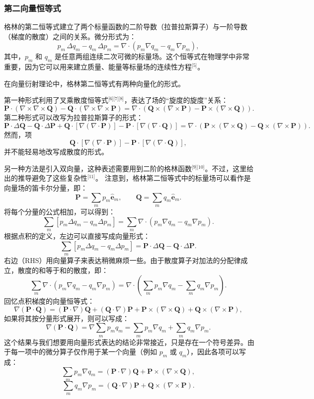 \subsubsection{第二向量恒等式}
格林的第二恒等式建立了两个标量函数的二阶导数（拉普拉斯算子）与一阶导数（梯度的散度）之间的关系。微分形式为：
$$
p_{m}\,\Delta q_{m} - q_{m}\,\Delta p_{m} = \nabla \cdot \left(p_{m}\nabla q_{m} - q_{m}\,\nabla p_{m}\right),~
$$
其中，$p_{m}$ 和 $q_{m}$ 是任意两组连续二次可微的标量场。这个恒等式在物理学中非常重要，因为它可以用来建立质量、能量等标量场的连续性方程\(^\text{[5]}\)。

在向量衍射理论中，格林第二恒等式有两种向量化的形式。

第一种形式利用了叉乘散度恒等式\(^\text{[6][7][8]}\)，表达了场的“旋度的旋度”关系：
$$
\mathbf{P} \cdot (\nabla \times \nabla \times \mathbf{Q})
- \mathbf{Q} \cdot (\nabla \times \nabla \times \mathbf{P})
= \nabla \cdot \left(\mathbf{Q} \times (\nabla \times \mathbf{P})
- \mathbf{P} \times (\nabla \times \mathbf{Q})\right).~
$$
第二种形式可以改写为拉普拉斯算子的形式：
$$
\mathbf{P} \cdot \Delta \mathbf{Q} 
- \mathbf{Q} \cdot \Delta \mathbf{P} 
+ \mathbf{Q} \cdot [\nabla (\nabla \cdot \mathbf{P})]
- \mathbf{P} \cdot [\nabla (\nabla \cdot \mathbf{Q})]
= 
\nabla \cdot \left(\mathbf{P} \times (\nabla \times \mathbf{Q})
- \mathbf{Q} \times (\nabla \times \mathbf{P})\right).~
$$
然而，项
$$
\mathbf{Q} \cdot \left[\nabla \left(\nabla \cdot \mathbf{P} \right)\right]
-\mathbf{P} \cdot \left[\nabla \left(\nabla \cdot \mathbf{Q} \right)\right],~
$$
并不能轻易地改写成散度的形式。

另一种方法是引入双向量，这种表述需要用到二阶的格林函数\(^\text{[9][10]}\)。不过，这里给出的推导避免了这些复杂性\(^\text{[11]}\)。
注意到，格林第二恒等式中的标量场可以看作是向量场的笛卡尔分量，即：
$$
\mathbf{P} = \sum_{m} p_m \hat{\mathbf{e}}_m,
\qquad
\mathbf{Q} = \sum_{m} q_m \hat{\mathbf{e}}_m.~
$$
将每个分量的公式相加，可以得到：
$$
\sum_{m} \left[ p_m \Delta q_m - q_m \Delta p_m \right]
=
\sum_{m} \nabla \cdot \left( p_m \nabla q_m - q_m \nabla p_m \right).~
$$
根据点积的定义，左边可以直接写成向量形式：
$$
\sum_{m} \left[ p_m \Delta q_m - q_m \Delta p_m \right]
=
\mathbf{P} \cdot \Delta \mathbf{Q}
-
\mathbf{Q} \cdot \Delta \mathbf{P}.~
$$
右边（RHS）用向量算子来表达稍微麻烦一些。由于散度算子对加法的分配律成立，散度的和等于和的散度，即：
$$
\sum_{m} \nabla \cdot \left(p_{m} \nabla q_{m} - q_{m} \nabla p_{m} \right)
=
\nabla \cdot
\left(
\sum_{m} p_{m} \nabla q_{m}
-
\sum_{m} q_{m} \nabla p_{m}
\right).~
$$
回忆点积梯度的向量恒等式：
$$
\nabla(\mathbf{P} \cdot \mathbf{Q})
=
(\mathbf{P} \cdot \nabla)\mathbf{Q}
+
(\mathbf{Q} \cdot \nabla)\mathbf{P}
+
\mathbf{P} \times (\nabla \times \mathbf{Q})
+
\mathbf{Q} \times (\nabla \times \mathbf{P}),~
$$
如果将其按分量形式展开，则可以写成：
$$
\nabla(\mathbf{P} \cdot \mathbf{Q})
=
\nabla \sum_{m} p_{m} q_{m}
=
\sum_{m} p_{m} \nabla q_{m}
+
\sum_{m} q_{m} \nabla p_{m}.~
$$
这个结果与我们想要用向量形式表达的结论非常接近，只是存在一个符号差异。由于每一项中的微分算子仅作用于某一个向量（例如 $p_m$ 或 $q_m$），因此各项可以写成：
$$
\sum_{m} p_{m} \nabla q_{m} = (\mathbf{P} \cdot \nabla)\mathbf{Q} + \mathbf{P} \times (\nabla \times \mathbf{Q}),~
$$
$$
\sum_{m} q_{m} \nabla p_{m} = (\mathbf{Q} \cdot \nabla)\mathbf{P} + \mathbf{Q} \times (\nabla \times \mathbf{P}).~
$$


